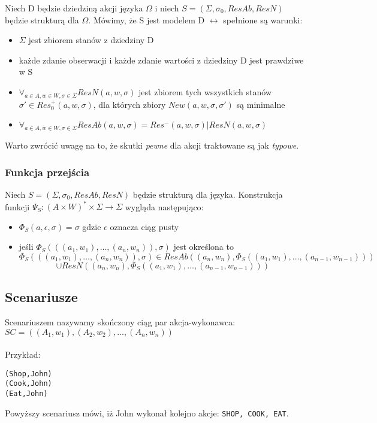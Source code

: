 \documentclass{article}
\begin{document}
Niech D będzie dziedziną akcji języka $\Omega$ i niech $S=(\Sigma, \sigma_{0}, ResAb, ResN)$ będzie strukturą dla $\Omega$. Mówimy, że S jest modelem D $\leftrightarrow$ spełnione są warunki:
\begin{itemize}
	\item $\Sigma$ jest zbiorem stanów z dziedziny D
	\item każde zdanie obserwacji i każde zdanie wartości z dziedziny D jest prawdziwe w S
	\item $\forall_{ a \in A, w \in W, \sigma \in \Sigma } ResN(a, w, \sigma)$ jest zbiorem tych wszystkich stanów $\sigma' \in Res_{0}^{+}(a, w, \sigma)$, dla których zbiory $New(a, w, \sigma, \sigma')$ są minimalne
	\item $\forall_{a \in A, w \in W, \sigma \in \Sigma} ResAb(a, w, \sigma) = Res^{-}(a, w, \sigma) | ResN(a, w, \sigma)$
\end{itemize}
Warto zwrócić uwagę na to, że skutki \textit{pewne} dla akcji traktowane są jak \textit{typowe}.

\subsubsection{Funkcja przejścia}
Niech $S=(\Sigma,\sigma_{0},ResAb,ResN)$ będzie strukturą dla języka. Konstrukcja funkcji $\Psi_{S} : (A \times W)^{*} \times \Sigma \to \Sigma$ wygląda następująco:
\begin{itemize}
	\item $\Phi_{S}(a,\epsilon,\sigma)=\sigma$ gdzie $\epsilon$ oznacza ciąg pusty
	\item jeśli $\Phi_{S}(((a_{1}, w_{1}), \dots, (a_{n}, w_{n})),\sigma)$ jest określona to
	\[\Phi_{S}(((a_{1}, w_{1}), \dots, (a_{n}, w_{n})),\sigma) \in ResAb((a_{n}, w_{n}), \Phi_{S}((a_{1}, w_{1}),\dots,(a_{n-1}, w_{n-1}))) \]
	\[ \cup ResN((a_{n}, w_{n}), \Phi_{S}((a_{1}, w_{1}),\dots,(a_{n-1}, w_{n-1})))\]
\end{itemize}
\subsection{Scenariusze}
Scenariuszem nazywamy skończony ciąg par akcja-wykonawca: $SC=((A_1,w_1),(A_2,w_2),...,(A_n,w_n))$
\paragraph{}Przykład:\\
\begin{lstlisting}[mathescape=true]
(Shop,John)
(Cook,John)
(Eat,John)
\end{lstlisting}
Powyższy scenariusz mówi, iż John wykonał kolejno akcje: \texttt{SHOP, COOK, EAT}.
\end{document}
